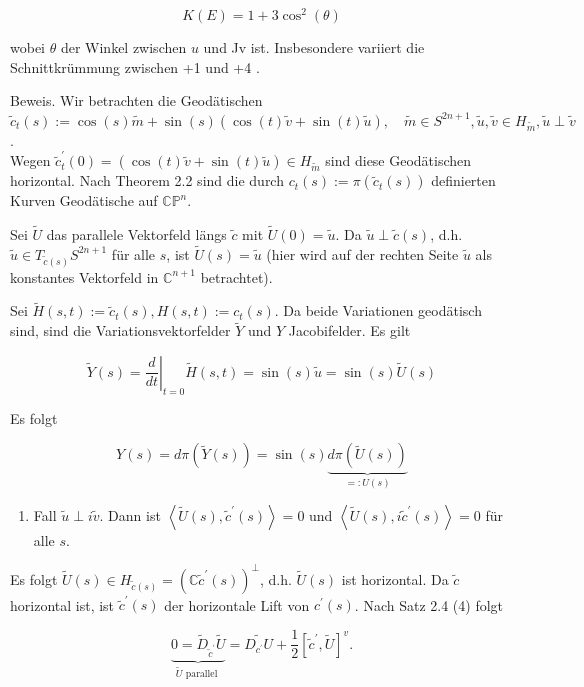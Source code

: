 \documentclass[10pt, letterpaper]{article}
\begin{document}
$$
K(E)=1+3 \cos ^{2}(\theta)
$$

wobei $\theta$ der Winkel zwischen $u$ und Jv ist. Insbesondere variiert die Schnittkrümmung zwischen +1 und +4 .

Beweis. Wir betrachten die Geodätischen\\
$\tilde{c}_{t}(s):=\cos (s) \tilde{m}+\sin (s)(\cos (t) \tilde{v}+\sin (t) \tilde{u}), \quad \tilde{m} \in S^{2 n+1}, \tilde{u}, \tilde{v} \in H_{\tilde{m}}, \tilde{u} \perp \tilde{v}$.\\
Wegen $\tilde{c}_{t}^{\prime}(0)=(\cos (t) \tilde{v}+\sin (t) \tilde{u}) \in H_{\tilde{m}}$ sind diese Geodätischen horizontal. Nach Theorem 2.2 sind die durch $c_{t}(s):=\pi\left(\tilde{c}_{t}(s)\right)$ definierten Kurven Geodätische auf $\mathbb{C P}^{n}$.

Sei $\tilde{U}$ das parallele Vektorfeld längs $\tilde{c}$ mit $\tilde{U}(0)=\tilde{u}$. Da $\tilde{u} \perp \tilde{c}(s)$, d.h. $\tilde{u} \in T_{\tilde{c}(s)} S^{2 n+1}$ für alle $s$, ist $\tilde{U}(s)=\tilde{u}$ (hier wird auf der rechten Seite $\tilde{u}$ als konstantes Vektorfeld in $\mathbb{C}^{n+1}$ betrachtet).

Sei $\tilde{H}(s, t):=\tilde{c}_{t}(s), H(s, t):=c_{t}(s)$. Da beide Variationen geodätisch sind, sind die Variationsvektorfelder $\tilde{Y}$ und $Y$ Jacobifelder. Es gilt

$$
\tilde{Y}(s)=\left.\frac{d}{d t}\right|_{t=0} \tilde{H}(s, t)=\sin (s) \tilde{u}=\sin (s) \tilde{U}(s)
$$

Es folgt


\begin{equation*}
Y(s)=d \pi(\tilde{Y}(s))=\sin (s) \underbrace{d \pi(\tilde{U}(s))}_{=: U(s)} \tag{9}
\end{equation*}


\begin{enumerate}
  \item Fall $\tilde{u} \perp i \tilde{v}$. Dann ist $\left\langle\tilde{U}(s), \tilde{c}^{\prime}(s)\right\rangle=0$ und $\left\langle\tilde{U}(s), i \tilde{c}^{\prime}(s)\right\rangle=0$ für alle $s$.
\end{enumerate}

Es folgt $\tilde{U}(s) \in H_{\tilde{c}(s)}=\left(\mathbb{C} \tilde{c}^{\prime}(s)\right)^{\perp}$, d.h. $\tilde{U}(s)$ ist horizontal. Da $\tilde{c}$ horizontal ist, ist $\tilde{c}^{\prime}(s)$ der horizontale Lift von $c^{\prime}(s)$. Nach Satz 2.4 (4) folgt

$$
\underbrace{0=\tilde{D}_{\tilde{c}^{\prime}} \tilde{U}}_{\tilde{U} \text { parallel }}=\widetilde{D_{c^{\prime}} U}+\frac{1}{2}\left[\tilde{c}^{\prime}, \tilde{U}\right]^{v} .
$$
\end{document}
